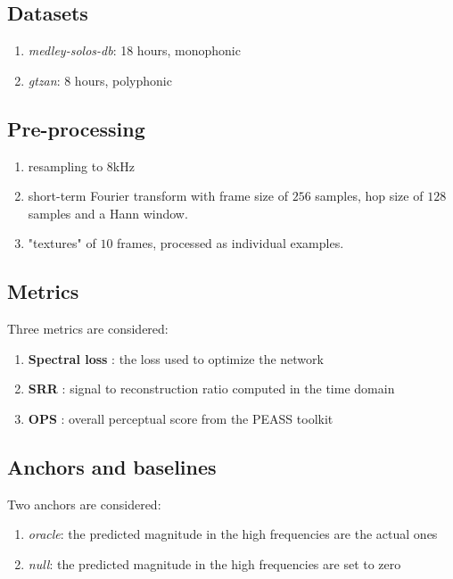 \documentclass[a0,portrait,20pt]{a0poster}
\begin{document}
\begin{multicols}{2}
\subsection*{Datasets}

\begin{enumerate}
  \item \textit{medley-solos-db}: 18 hours, monophonic
  \item \textit{gtzan}: 8 hours, polyphonic
\end{enumerate}

\subsection*{Pre-processing}

\begin{enumerate}
  \item resampling to $8$kHz
  \item short-term Fourier transform with frame size of $256$ samples, hop size of $128$ samples and a Hann window.
  \item "textures" of $10$ frames, processed as individual examples.
\end{enumerate}

\subsection*{Metrics}

Three metrics are considered:
\begin{enumerate}
  \item \textbf{Spectral loss} : the loss used to optimize the network
  \item \textbf{SRR} : signal to reconstruction ratio computed in the time domain
  \item \textbf{OPS} : overall perceptual score from the PEASS toolkit \cite{emiya2011subjective}
\end{enumerate}

\subsection*{Anchors and baselines}

Two anchors are considered:
\begin{enumerate}
  \item \textit{oracle}: the predicted magnitude in the high frequencies are the actual ones
  \item \textit{null}: the predicted magnitude in the high frequencies are set to zero
\end{enumerate}


\end{multicols}
\end{document}
